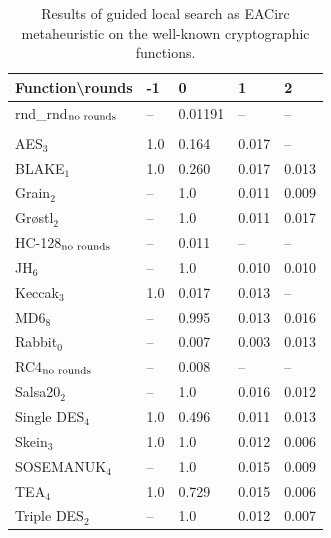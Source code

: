\documentclass[
    digital,    %
    oneside,    %
    color,
    11pt,
    nocover,
    notable,
    nolof,
    nolot,
]{fithesis3}
\newcommand{\fd}{\cellcolor{red!25}}
\newcommand{\fn}{}
\begin{document}
\begin{table}[H]
\centering
\begin{tabular}{l|l l l l}
\textbf{\large Function\textbackslash{}rounds} & \textbf{\large -1} & \textbf{\large 0} & \textbf{\large 1} & \textbf{\large 2}\\ \hline
rnd\_rnd$_{\textnormal{no rounds}}$ & -- & \fn{}0.01191& --  & --   \\\\
AES$_{3}$        & \fd{}1.0   & \fd{}0.164 & \fn{}0.017 & \fn{}--   \\
BLAKE$_{1}$      & \fd{}1.0   & \fd{}0.260 & \fn{}0.017 & \fn{}0.013\\
Grain$_{2}$      & \fd{}--    & \fd{}1.0   & \fn{}0.011 & \fn{}0.009\\
Gr\o stl$_{2}$   & \fd{}--    & \fd{}1.0   & \fn{}0.011 & \fn{}0.017\\
HC-128$_{\textnormal{no rounds}}$& -- & \fn{}0.011 & -- & --        \\
JH$_{6}$         & \fd{}--    & \fd{}1.0   & \fn{}0.010 & \fn{}0.010\\
Keccak$_{3}$     & \fd{}1.0   & \fn{}0.017 & \fn{}0.013 & \fn{}--   \\
MD6$_{8}$        & \fd{}--    & \fd{}0.995 & \fn{}0.013 & \fn{}0.016\\
Rabbit$_{0}$     &      --    & \fn{}0.007 & \fn{}0.003 & \fn{}0.013\\
RC4$_{\textnormal{no rounds}}$& -- & \fn{}0.008 & --    & --        \\
Salsa20$_{2}$    & \fd{}--    & \fd{}1.0   & \fn{}0.016 & \fn{}0.012\\
Single DES$_{4}$ & \fd{}1.0   & \fd{}0.496 & \fn{}0.011 & \fn{}0.013\\
Skein$_{3}$      & \fd{}1.0   & \fd{}1.0   & \fn{}0.012 & \fn{}0.006\\
SOSEMANUK$_{4}$  & \fd{}--    & \fd{}1.0   & \fn{}0.015 & \fn{}0.009\\
TEA$_{4}$        & \fd{}1.0   & \fd{}0.729 & \fn{}0.015 & \fn{}0.006\\
Triple DES$_{2}$ & \fd{}--    & \fd{}1.0   & \fn{}0.012 & \fn{}0.007
\end{tabular}
\caption{Results of guided local search as EACirc metaheuristic on the well-known cryptographic functions.}
\label{table:res-usable-gls}
\end{table}
\end{document}
